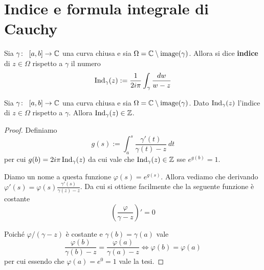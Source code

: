 \section{Indice e formula integrale di Cauchy}

\begin{definition}
  \label{def:indice-in-z}
  Sia $\gamma \colon\ \left[ a,b \right] \rightarrow \mathbb{C}$ una curva chiusa e sia
  $\Omega = \mathbb{C} \setminus \operatorname{image}(\gamma)$. Allora si dice \textbf{indice} di
  $z \in \Omega$ rispetto a $\gamma$ il numero 
  \begin{equation*}
    \operatorname{Ind}_\gamma(z) := \frac{1}{2i\pi} \int_\gamma
    \frac{dw}{w-z}
  \end{equation*}
\end{definition}

\begin{lemma}
  Sia $\gamma \colon\ \left[ a,b \right] \rightarrow \mathbb{C}$ una curva chiusa e sia
  $\Omega = \mathbb{C} \setminus \operatorname{image}(\gamma)$. Dato $\operatorname{Ind}_\gamma(z)$
  l'indice di $z \in \Omega$ rispetto a $\gamma$. Allora
  $\operatorname{Ind}_\gamma(z) \in \mathbb{Z}$.
  \label{lem:index-is-natural-number}
\end{lemma}
\begin{proof}
  Definiamo 
  \begin{equation*}
    g(s) := \int^{s}_{a} \frac{\gamma'(t)}{\gamma(t) - z} \ dt
  \end{equation*}
  per cui $g(b) = 2i\pi\operatorname{Ind}_\gamma(z)$ da cui vale che
  $\operatorname{Ind}_\gamma(z) \in \mathbb{Z}$ sse $e^{g(b)} = 1$. 
  
  Diamo un nome a questa funzione $\varphi(s) = e^{g(s)}$. Allora vediamo
  che derivando $\varphi'(s) = \varphi(s) \frac{\gamma'(s)}{\gamma(z) - z}$.
  Da cui si ottiene facilmente che la seguente funzione è costante
  \begin{equation*}
    \left(\frac{\varphi}{\gamma - z}\right)' = 0
  \end{equation*}

  Poiché $\varphi/(\gamma - z)$ è costante e $\gamma(b) = \gamma(a)$ vale 
  \begin{equation*}
    \frac{\varphi(b)}{\gamma(b) - z} = \frac{\varphi(a)}{\gamma(a) - z}
    \Longleftrightarrow \varphi(b) = \varphi(a)
  \end{equation*}
  per cui essendo che $\varphi(a) = e^0 = 1$ vale la tesi.
\end{proof}

